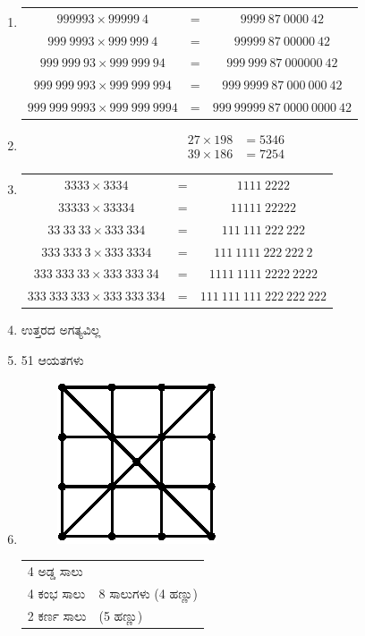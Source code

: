 \begin{enumerate}
\item 
\begin{tabular}[t]{ccc}
$999993\times 99999~4$ & = & $9999~87~0000~42$\\
$999~9993\times 999~999~4$ & = & $99999~87~00000~42$\\
$999~999~93\times 999~999~94$ & = & $999~999~87~000000~42$\\
$999~999~993\times 999~999~994$ & = & $999~9999~87~000~000~42$\\
$999~999~9993\times 999~999~9994$ & = & $999~99999~87~0000~0000~42$
\end{tabular}

\item 
\begin{align*}
27\times 198 & = 5346\\
39\times 186 & = 7254
\end{align*}

\item 
\begin{tabular}[t]{ccc}
$3333\times 3334$ & = & $1111~2222$\\
$33333\times 33334$ & = & $11111~22222$\\
$33~33~33\times 333~334$ & = & $111~111~222~222$\\
$333~333~3\times 333~3334$ & = & $111~1111~222~222~2$\\
$333~333~33\times 333~333~34$ & = & $1111~1111~2222~2222$\\
$333~333~333\times 333~333~334$ & = & $111~111~111~222~222~222$\\
\end{tabular}

\item ಉತ್ತರದ ಅಗತ್ಯವಿಲ್ಲ 

\item 51 ಆಯತಗಳು 

\item 
\begin{figure}[H]
\centering
\includegraphics{images/chap12/ans20.eps}
\end{figure}
\begin{tabular}[t]{ll}
4 ಅಡ್ಡ ಸಾಲು & \\
4 ಕಂಭ ಸಾಲು & 8 ಸಾಲುಗಳು (4 ಹಣ್ಣು)\\[0.2cm]
2 ಕರ್ಣ ಸಾಲು & (5 ಹಣ್ಣು)
\end{tabular}


\end{enumerate}
